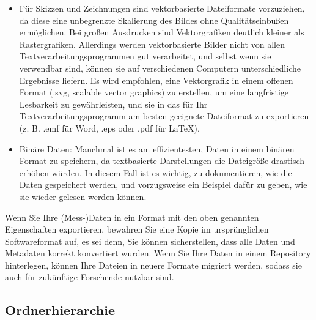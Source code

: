 \begin{itemize}
        Es ergibt größere Dateigrößen als .jpg für Fotos, ist aber sehr gut für
        Strichzeichnungen geeignet.
  \item Für Skizzen und Zeichnungen sind vektorbasierte Dateiformate
        vorzuziehen, da diese eine unbegrenzte Skalierung des Bildes ohne
        Qualitätseinbußen ermöglichen. Bei großen Ausdrucken sind
        Vektorgrafiken deutlich kleiner als Rastergrafiken. Allerdings werden
        vektorbasierte Bilder nicht von allen Textverarbeitungsprogrammen gut
        verarbeitet, und selbst wenn sie verwendbar sind, können sie auf
        verschiedenen Computern unterschiedliche Ergebnisse liefern. Es wird
        empfohlen, eine Vektorgrafik in einem offenen Format (.svg, scalable
        vector graphics) zu erstellen, um eine langfristige Lesbarkeit zu
        gewährleisten, und sie in das für Ihr Textverarbeitungsprogramm am
        besten geeignete Dateiformat zu exportieren (z. B. .emf für Word, .eps
        oder .pdf für LaTeX).
  \item Binäre Daten: Manchmal ist es am effizientesten, Daten in einem binären
        Format zu speichern, da textbasierte Darstellungen die Dateigröße
        drastisch erhöhen würden. In diesem Fall ist es wichtig, zu
        dokumentieren, wie die Daten gespeichert werden, und vorzugsweise ein
        Beispiel dafür zu geben, wie sie wieder gelesen werden können.
\end{itemize}

\noindent Wenn Sie Ihre (Mess-)Daten in ein Format mit den
oben genannten Eigenschaften exportieren, bewahren Sie eine Kopie im
ursprünglichen Softwareformat auf, es sei denn, Sie können sicherstellen, dass
alle Daten und Metadaten korrekt konvertiert wurden. Wenn Sie Ihre Daten in
einem Repository hinterlegen, können Ihre Dateien in neuere Formate migriert
werden, sodass sie auch für zukünftige Forschende nutzbar sind.

\subsection{Ordnerhierarchie}

